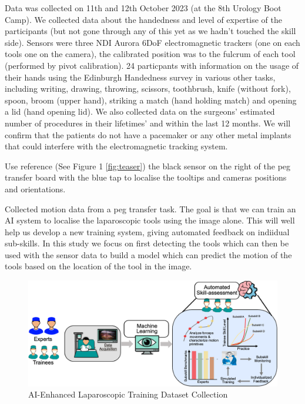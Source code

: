 Data was collected on 11th and 12th October 2023 (at the 8th Urology Boot Camp).
We collected data about the handedness and level of expertise of the participants (but not gone through any of this yet as we hadn't touched the skill side).
Sensors were three NDI Aurora 6DoF electromagnetic trackers (one on each tools one on the camera), the calibrated position was to the fulcrum of each tool (performed by pivot calibration).
24 particpants with information on the usage of their hands using the Edinburgh Handedness survey \cite{oldfield_assessment_1971} in various other tasks, including writing, drawing, throwing, scissors, toothbrush, knife (without fork), spoon, broom (upper hand), striking a match (hand holding match) and opening a lid (hand opening lid).
We also collected data on the surgeons' estimated number of procedures in their lifetimes' and within the last 12 months.
We will confirm that the patients do not have a pacemaker or any other metal implants that could interfere with the electromagnetic tracking system.

Use reference (See Figure 1 \ref{fig:teaser}) the black sensor on the right of the peg transfer board with the blue tap to localise the tooltips and cameras positions and orientations.

Collected motion data from a peg transfer task. The goal is that we can train an AI system to localise the laparoscopic tools using the image alone. This will well help us develop a new training system, giving automated feedback on indiidual sub-skills. In this study we focus on first detecting the tools which can then be used with the sensor data to build a model which can predict the motion of the tools based on the location of the tool in the image.


\begin{figure}
    \centering
    \includegraphics[width=1\linewidth]{dataset_collection.png}
    \caption{AI-Enhanced Laparoscopic Training Dataset Collection}
    \label{fig:dataset-collection}
\end{figure}

